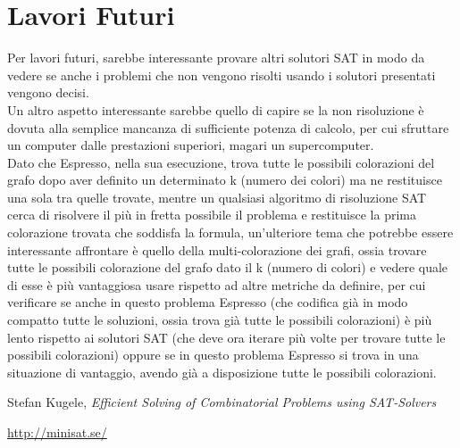 \documentclass[a4paper,11pt]{article} %
\begin{document}
\section{Lavori Futuri}
Per lavori futuri, sarebbe interessante provare altri solutori SAT in modo da vedere se anche i problemi che non vengono risolti usando i solutori presentati vengono decisi.\\
Un altro aspetto interessante sarebbe quello di capire se la non risoluzione è dovuta alla semplice mancanza di sufficiente potenza di calcolo, per cui sfruttare un computer dalle prestazioni superiori, magari un supercomputer.\\
Dato che Espresso, nella sua esecuzione, trova tutte le possibili colorazioni del grafo dopo aver definito un determinato k (numero dei colori) ma ne restituisce una sola tra quelle trovate, mentre un qualsiasi algoritmo di risoluzione SAT cerca di risolvere il più in fretta possibile il problema e restituisce la prima colorazione trovata che soddisfa la formula, un'ulteriore tema che potrebbe essere interessante affrontare è quello della multi-colorazione dei grafi, ossia trovare tutte le possibili colorazione del grafo dato il k (numero di colori) e vedere quale di esse è più vantaggiosa usare rispetto ad altre metriche da definire, per cui verificare se anche in questo problema Espresso (che codifica già in modo compatto tutte le soluzioni, ossia trova già tutte le possibili colorazioni) è più lento rispetto ai solutori SAT (che deve ora iterare più volte per trovare tutte le possibili colorazioni) oppure se in questo problema Espresso si trova in una situazione di vantaggio, avendo già a disposizione tutte le possibili colorazioni.


\pagebreak

\begin{thebibliography}{9}
	 Stefan Kugele,  
	\emph{Efficient Solving of Combinatorial Problems using SAT-Solvers}
	
	 \href{http://minisat.se/}{http://minisat.se/}
\end{thebibliography}
\end{document}
